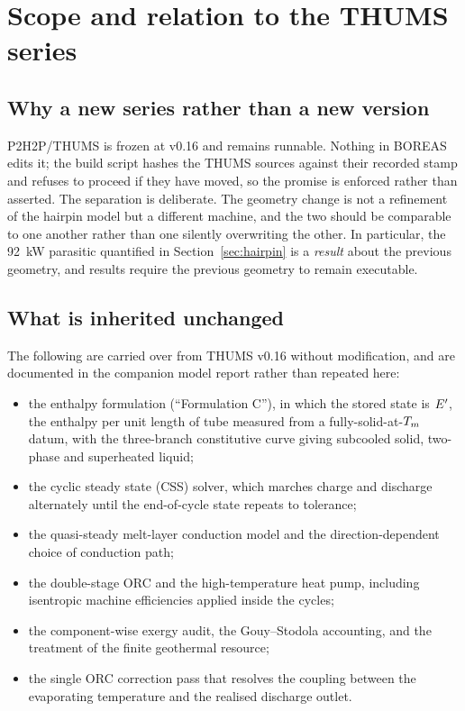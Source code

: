 \section{Scope and relation to the THUMS series}

\subsection{Why a new series rather than a new version}

P2H2P/THUMS is frozen at v0.16 and remains runnable. Nothing in BOREAS edits
it; the build script hashes the THUMS sources against their recorded stamp and
refuses to proceed if they have moved, so the promise is enforced rather than
asserted. The separation is deliberate. The geometry change is not a refinement
of the hairpin model but a different machine, and the two should be comparable
to one another rather than one silently overwriting the other. In particular,
the \SI{92}{\kilo\watt} parasitic quantified in Section~\ref{sec:hairpin} is a
\emph{result} about the previous geometry, and results require the previous
geometry to remain executable.

\subsection{What is inherited unchanged}

The following are carried over from THUMS v0.16 without modification, and are
documented in the companion model report rather than repeated here:

\begin{itemize}[nosep]
\item the enthalpy formulation (``Formulation C''), in which the stored state
      is $E'$, the enthalpy per unit length of tube measured from a
      fully-solid-at-$T_{m}$ datum, with the three-branch constitutive curve
      giving subcooled solid, two-phase and superheated liquid;
\item the cyclic steady state (CSS) solver, which marches charge and discharge
      alternately until the end-of-cycle state repeats to tolerance;
\item the quasi-steady melt-layer conduction model and the direction-dependent
      choice of conduction path;
\item the double-stage ORC and the high-temperature heat pump, including
      isentropic machine efficiencies applied inside the cycles;
\item the component-wise exergy audit, the Gouy--Stodola accounting, and the
      treatment of the finite geothermal resource;
\item the single ORC correction pass that resolves the coupling between the
      evaporating temperature and the realised discharge outlet.
\end{itemize}

